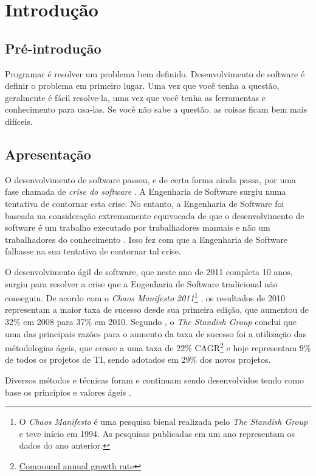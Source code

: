\chapter{Introdução}

\section{Pré-introdução}

Programar é resolver um problema bem definido. Desenvolvimento de software é
definir o problema em primeiro lugar. Uma vez que você tenha a questão,
geralmente é fácil resolve-la, uma vez que você tenha as ferramentas e
conhecimento para usa-las. Se você não sabe a questão. as coisas ficam bem mais
difíceis. \cite{ProgrammingIsEasySoftwareDevelopmentIsHard}

\section{Apresentação}

O desenvolvimento de software passou, e de certa forma ainda passa, por uma fase
chamada de \emph{crise do software} \cite{HumbleProgrammer}. A Engenharia de
Software surgiu \cite{NaurRandell} numa tentativa de contornar esta crise. No
entanto, a Engenharia de Software foi baseada na consideração extremamente
equivocada de que o desenvolvimento de software é um trabalho executado por
trabalhadores manuais e não um trabalhadores do conhecimento \cite[38]{XPTeles}.
Isso fez com que a Engenharia de Software falhasse na sua tentativa de contornar
tal crise.

O desenvolvimento ágil de software, que neste ano de 2011 completa 10 anos,
surgiu \cite{AgileManifesto} para resolver a crise que a Engenharia de Software
tradicional não conseguiu. De acordo com o
\textit{Chaos Manifesto 2011}\footnote{O \textit{Chaos Manifesto} é uma pesquisa
bienal realizada pelo \textit{The Standish Group} e teve início em 1994. As
pesquisas publicadas em um ano representam os dados do ano anterior.}
\cite{PMNetworkFailureDrop}, os resultados de 2010 representam a maior taxa de
sucesso desde sua primeira edição, que aumentou de 32\% em 2008 para 37\% em
2010. Segundo \cite{ResumoChaosReport}, o \textit{The Standish Group} conclui
que uma das principais razões para o aumento da taxa de sucesso foi a utilização
das métodologias ágeis, que cresce a uma taxa de 22\%
CAGR\footnote{\href{http://en.wikipedia.org/wiki/Compound_annual_growth_rate}{Compound
annual growth rate}} e hoje representam 9\% de todos os projetos de TI, sendo
adotados em 29\% dos novos projetos.

Diversos métodos e técnicas foram e continuam sendo desenvolvidos tendo como
base os princípios e valores ágeis \cite{BDDRodrigo}.
